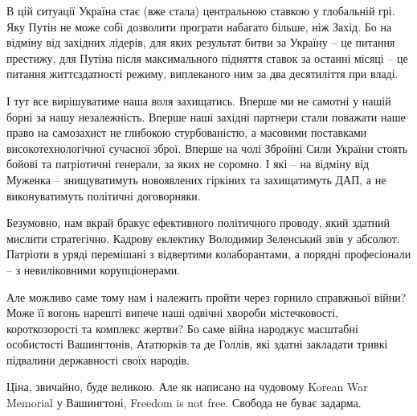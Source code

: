 В цій ситуації Україна стає (вже стала) центральною ставкою у глобальній грі.
Яку Путін не може собі дозволити програти набагато більше, ніж Захід. Бо на
відміну від західних лідерів, для яких результат битви за Україну – це питання
престижу, для Путіна після максимального підняття ставок за останні місяці – це
питання життєздатності режиму, виплеканого ним за два десятиліття при владі.

І тут все вирішуватиме наша воля захищатись. Вперше ми не самотні у нашій борні
за нашу незалежність. Вперше наші західні партнери стали поважати наше право на
самозахист не глибокою стурбованістю, а масовими поставками високотехнологічної
сучасної зброї. Вперше на чолі Збройні Сили України стоять бойові та
патріотичні генерали, за яких не соромно. І які – на відміну від Муженка –
знищуватимуть новоявлених гіркіних та захищатимуть ДАП, а не виконуватимуть
політичні договорняки.

Безумовно, нам вкрай бракує ефективного політичного проводу, який здатний
мислити стратегічно. Кадрову еклектику Володимир Зеленський звів у абсолют.
Патріоти в уряді перемішані з відвертими колаборантами, а порядні професіонали
– з невиліковними корупціонерами. 

Але можливо саме тому нам і належить пройти через горнило справжньої війни?
Може її вогонь нарешті випече наші одвічні хвороби містечковості,
короткозорості та комплекс жертви? Бо саме війна народжує масштабні особистості
Вашингтонів, Ататюрків та де Голлів, які здатні закладати тривкі підвалини
державності своїх народів. 

Ціна, звичайно, буде великою. Але як написано на чудовому Korean War Memorial у
Вашингтоні, Freedom is not free. Свобода не буває задарма.

